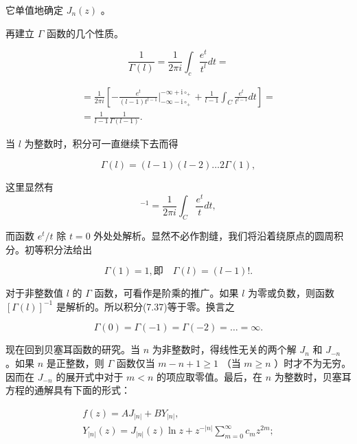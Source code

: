 它单值地确定 $J_{n}(z)$ 。

再建立 $\Gamma$ 函数的几个性质。

\begin{equation*}
\frac {1}{\Gamma (l)} = \frac {1}{2 \pi i} \int_ {c} \frac {e ^ {t}}{t ^ {l}} d t =
\end{equation*}

\begin{equation*}
\begin{array}{l} = \frac {1}{2 \pi i} \left[ - \frac {e ^ {t}}{(l - 1) t ^ {l - 1}} \Bigg | _ {- \infty - \mathrm{i} \circ_ {+}} ^ {- \infty + \mathrm{i} \circ_ {+}} + \frac {1}{l - 1} \int_ {C} \frac {e ^ {t}}{t ^ {l - 1}} d t \right] = \\ = \frac {1}{l - 1} \frac {1}{\Gamma (l - 1)}. \end{array}
\end{equation*}

当 $l$ 为整数时，积分可一直继续下去而得

\begin{equation*}
\Gamma (l) = (l - 1) (l - 2) \dots 2 \Gamma (1),
\end{equation*}

这里显然有
\begin{equation*}
[ \Gamma (1) ] ^ {- 1} = \frac {1}{2 \pi i} \int_ {C} \frac {e ^ {t}}{t} d t,
\end{equation*}

而函数 $e^t / t$ 除 $t = 0$ 外处处解析。显然不必作割缝，我们将沿着绕原点的圆周积分。初等积分法给出

\begin{equation*}
\Gamma (1) = 1, \text {即} \quad \Gamma (l) = (l - 1)!.
\end{equation*}

对于非整数值 $l$ 的 $\Gamma$ 函数，可看作是阶乘的推广。如果 $l$ 为零或负数，则函数 $[\Gamma(l)]^{-1}$ 是解析的。所以积分(7.37)等于零。换言之

\begin{equation*}
\Gamma (0) = \Gamma (- 1) = \Gamma (- 2) = \dots = \infty .
\end{equation*}

现在回到贝塞耳函数的研究。当 $n$ 为非整数时，得线性无关的两个解 $J_{n}$ 和 $J_{-n}$ 。如果 $n$ 是正整数，则 $\Gamma$ 函数仅当 $m - n + 1 \geqslant 1$ （当 $m \geqslant n$ ）时才不为无穷。因而在 $J_{-n}$ 的展开式中对于 $m < n$ 的项应取零值。最后，在 $n$ 为整数时，贝塞耳方程的通解具有下面的形式：

\begin{equation*}
\begin{array}{l} f (z) = A J _ {| n |} + B Y _ {| n |}, \\ Y _ {| n |} (z) = J _ {| n |} (z) \ln z + z ^ {- | n |} \sum_ {m = 0} ^ {\infty} c _ {m} z ^ {2 m}; \end{array}\tag{7.38}
\end{equation*}

